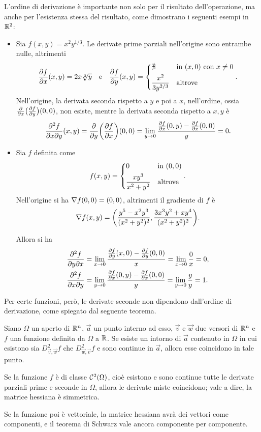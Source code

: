 L'ordine di derivazione è importante non solo per il risultato dell'operazione, ma anche per l'esistenza stessa del risultato, come dimostrano i seguenti esempi in $\mathbb{R}^2$:
\begin{itemize}
\item Sia $f(x,y)=x^2y^{1/3}$. Le derivate prime parziali nell'origine sono entrambe nulle, altrimenti
\[
\drp{f}{x}(x,y)=2x\sqrt[3]{y}\qtext{e}\drp{f}{y}(x,y)=\begin{dcases*}\nexists&in $(x,0)$ con $x\neq 0$\\\frac{x^2}{3y^{2/3}}&altrove\end{dcases*}.
\]
Nell'origine, la derivata seconda rispetto a $y$ e poi a $x$, nell'ordine, ossia $\frac{\partial {}}{\partial {x}}\big(\frac{\partial {f}}{\partial {y}}\big)(0,0)$, non esiste, mentre la derivata seconda rispetto a $x,y$ è
\[
\frac{\partial^2f}{\partial x\partial y}(x,y)=\frac{\partial {}}{\partial {y}}\bigg(\frac{\partial {f}}{\partial {x}}\bigg)(0,0)=\lim_{y\to 0}\frac{\frac{\partial {f}}{\partial {x}}(0,y)-\frac{\partial {f}}{\partial {x}}(0,0)}{y}=0.
\]
\item Sia $f$ definita come
\[
f(x,y)=\begin{dcases*}0&in $(0,0)$\\\frac{xy^3}{x^2+y^2}&altrove\end{dcases*}.
\]
Nell'origine si ha $\nabla f(0,0)=(0,0)$, altrimenti il gradiente di $f$ è
\[
\nabla f(x,y)=\bigg(\frac{y^5-x^2y^3}{(x^2+y^2)^2},\frac{3x^3y^2+xy^4}{(x^2+y^2)^2}\bigg).
\]

Allora si ha
\begin{align*}
&\frac{\partial^2f}{\partial y\partial x}=\lim_{x\to 0}\frac{\frac{\partial {f}}{\partial {y}}(x,0)-\frac{\partial {f}}{\partial {y}}(0,0)}{x}=\lim_{x\to 0}\frac0{x}=0,\\
&\frac{\partial^2f}{\partial x\partial y}=\lim_{y\to 0}\frac{\frac{\partial {f}}{\partial {x}}(0,y)-\frac{\partial {f}}{\partial {x}}(0,0)}{y}=\lim_{y\to 0}\frac{y}{y}=1.
\end{align*}
\end{itemize}
Per certe funzioni, però, le derivate seconde non dipendono dall'ordine di derivazione, come spiegato dal seguente teorema.
\begin{teorema}[di Schwartz] \label{t:schwarz}
Siano $\Omega$ un aperto di $\mathbb{R}^n$, $\vec a$ un punto interno ad esso, $\vec v$ e $\vec w$ due versori di $\mathbb{R}^n$ e $f$ una funzione definita da $\Omega$ a $\mathbb{R}$. Se esiste un intorno di $\vec a$ contenuto in $\Omega$ in cui esistono sia $D^2_{\vec v,\vec w}f$ che $D^2_{\vec w,\vec v}f$ e sono continue in $\vec a$, allora esse coincidono in tale punto.
\end{teorema}
\begin{corollario}
Se la funzione $f$ è di classe $\mathcal{C}^{{2}}(\Omega)$, cioè esistono e sono continue tutte le derivate parziali prime e seconde in $\Omega$, allora le derivate miste coincidono; vale a dire, la matrice hessiana è simmetrica.
\end{corollario}
Se la funzione poi è vettoriale, la matrice hessiana avrà dei vettori come componenti, e il teorema di Schwarz vale ancora componente per componente.%

